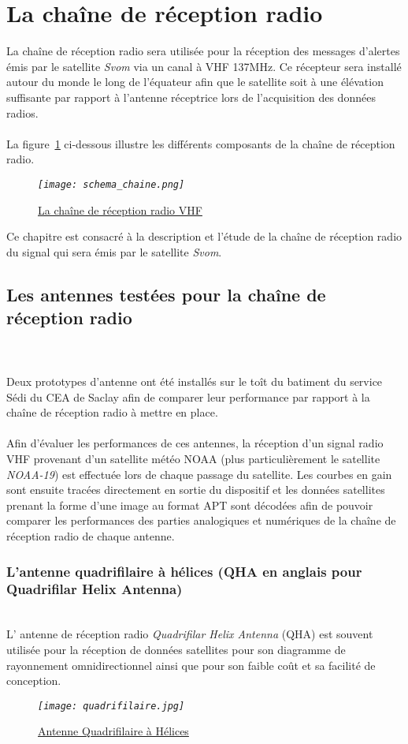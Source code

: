 \documentclass[12pt,fleqn]{book} %
\begin{document}
\part{La chaîne de réception radio}
La chaîne de réception radio sera utilisée pour la réception des messages d'alertes émis par le satellite \emph{Svom} via un canal à VHF 137MHz. Ce récepteur sera installé autour du monde le long de l'équateur afin que le satellite soit à une élévation suffisante par rapport à l'antenne réceptrice lors de l'acquisition des données radios.
~\\\\La figure~\underline{\color{blue}\ref{schema_chaine}} ci-dessous illustre les différents composants de la chaîne de réception radio.
\begin{figure}[H]
	\centering
	\itshape
	\texttt{[image: schema\_chaine.png]}
	\caption{\label{schema_chaine} \underline{La chaîne de réception radio VHF}}
\end{figure}
\noindent Ce chapitre est consacré à la description et l'étude de la chaîne de réception radio du signal qui sera émis par le satellite \emph{Svom}.

\chapter{Les antennes testées pour la chaîne de réception radio} 
~\\\\Deux prototypes d'antenne ont été installés sur le toît du batiment du service Sédi du CEA de Saclay afin de comparer leur performance par rapport à la chaîne de réception radio à mettre en place.
~\\\\Afin d'évaluer les performances de ces antennes, la réception d'un signal radio VHF provenant d'un satellite météo NOAA (plus particulièrement le satellite \emph{NOAA-19}) est effectuée lors de chaque passage du satellite. Les courbes en gain sont ensuite tracées directement en sortie du dispositif et les données satellites prenant la forme d'une image au format APT sont décodées afin de pouvoir comparer les performances des parties analogiques et numériques de la chaîne de réception radio de chaque antenne.
\section{L'antenne quadrifilaire à hélices (QHA en anglais pour Quadrifilar Helix Antenna)}
~\\\indent L' antenne de réception radio \emph{Quadrifilar Helix Antenna} (QHA) est souvent utilisée pour la réception de données satellites pour son diagramme de rayonnement omnidirectionnel ainsi que pour son faible coût et sa facilité de conception.
\begin{figure}[H]
	\centering
	\itshape
	\texttt{[image: quadrifilaire.jpg]}
	\caption{\label{QHA} \underline{Antenne Quadrifilaire à Hélices}}
\end{figure}
~\\
\end{document}

